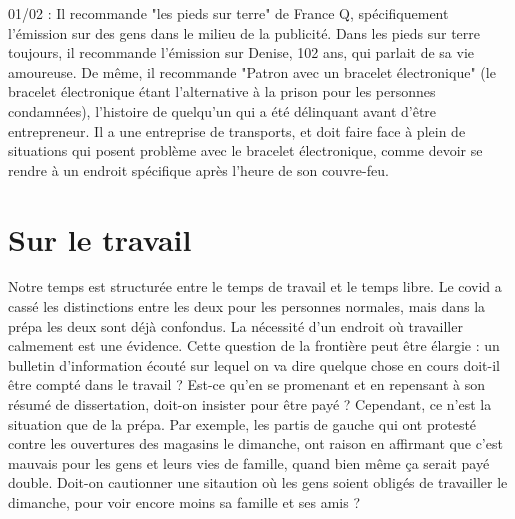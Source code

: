 \documentclass[a4paper,12pt]{book}
\begin{document}
\par 01/02 : Il recommande "les pieds sur terre" de France Q, spécifiquement l'émission sur des gens dans le milieu de la publicité. Dans les pieds sur terre toujours, il recommande l'émission sur Denise, 102 ans, qui parlait de sa vie amoureuse. De même, il recommande "Patron avec un bracelet électronique" (le bracelet électronique étant l'alternative à la prison pour les personnes condamnées), l'histoire de quelqu'un qui a été délinquant avant d'être entrepreneur. Il a une entreprise de transports, et doit faire face à plein de situations qui posent problème avec le bracelet électronique, comme devoir se rendre à un endroit spécifique après l'heure de son couvre-feu.



\section{Sur le travail}
\par Notre temps est structurée entre le temps de travail et le temps libre. Le covid a cassé les distinctions entre les deux pour les personnes normales, mais dans la prépa les deux sont déjà confondus. La nécessité d'un endroit où travailler calmement est une évidence. Cette question de la frontière peut être élargie : un bulletin d'information écouté sur lequel on va dire quelque chose en cours doit-il être compté dans le travail ? Est-ce qu'en se promenant et en repensant à son résumé de dissertation, doit-on insister pour être payé ? Cependant, ce n'est la situation que de la prépa. Par exemple, les partis de gauche qui ont protesté contre les ouvertures des magasins le dimanche, ont raison en affirmant que c'est mauvais pour les gens et leurs vies de famille, quand bien même ça serait payé double. Doit-on cautionner une sitaution où les gens soient obligés de travailler le dimanche, pour voir encore moins sa famille et ses amis ?
\end{document}
